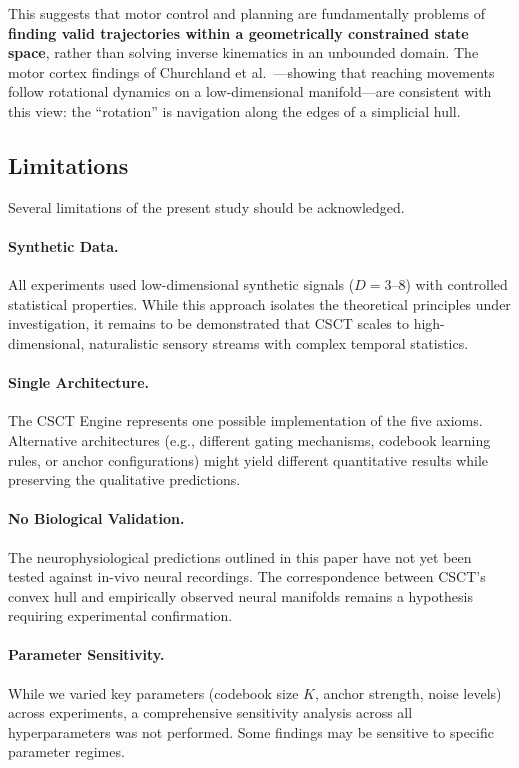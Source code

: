 \documentclass{article}
\begin{document}
This suggests that motor control and planning are fundamentally problems of \textbf{finding valid trajectories within a geometrically constrained state space}, rather than solving inverse kinematics in an unbounded domain.
The motor cortex findings of Churchland et al.~\cite{churchland2012neural}---showing that reaching movements follow rotational dynamics on a low-dimensional manifold---are consistent with this view: the ``rotation'' is navigation along the edges of a simplicial hull.

\subsection{Limitations}

Several limitations of the present study should be acknowledged.

\paragraph{Synthetic Data.}
All experiments used low-dimensional synthetic signals ($D = 3$--$8$) with controlled statistical properties.
While this approach isolates the theoretical principles under investigation, it remains to be demonstrated that CSCT scales to high-dimensional, naturalistic sensory streams with complex temporal statistics.

\paragraph{Single Architecture.}
The CSCT Engine represents one possible implementation of the five axioms.
Alternative architectures (e.g., different gating mechanisms, codebook learning rules, or anchor configurations) might yield different quantitative results while preserving the qualitative predictions.

\paragraph{No Biological Validation.}
The neurophysiological predictions outlined in this paper have not yet been tested against in-vivo neural recordings.
The correspondence between CSCT's convex hull and empirically observed neural manifolds remains a hypothesis requiring experimental confirmation.

\paragraph{Parameter Sensitivity.}
While we varied key parameters (codebook size $K$, anchor strength, noise levels) across experiments, a comprehensive sensitivity analysis across all hyperparameters was not performed.
Some findings may be sensitive to specific parameter regimes.
\end{document}
